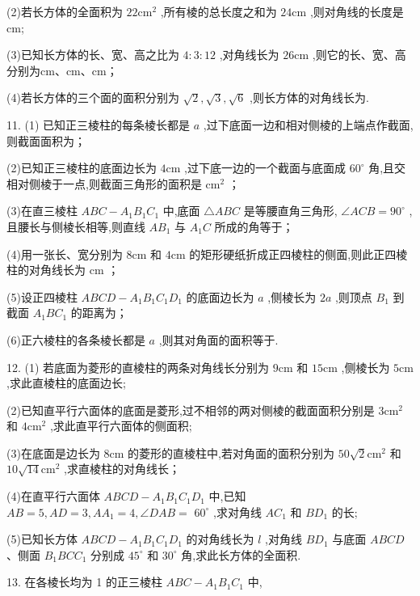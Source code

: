 (2)若长方体的全面积为 ${22}{\mathrm{{cm}}}^{2}$ ,所有棱的总长度之和为 ${24}\mathrm{{cm}}$ ,则对角线的长度是\blkda{}cm;

(3)已知长方体的长、宽、高之比为 $4 : 3 : {12}$ ,对角线长为 ${26}\mathrm{{cm}}$ ,则它的长、宽、高分别为\blkda{}cm、\blkda{}cm、\blkda{}cm；

(4)若长方体的三个面的面积分别为 $\sqrt{2},\sqrt{3},\sqrt{6}$ ,则长方体的对角线长为\blkda{}.

11. (1) 已知正三棱柱的每条棱长都是 $a$ ,过下底面一边和相对侧棱的上端点作截面,则截面面积为\blkda{}；

(2)已知正三棱柱的底面边长为 $4\mathrm{{cm}}$ ,过下底一边的一个截面与底面成 ${60}^{ \circ  }$ 角,且交相对侧棱于一点,则截面三角形的面积是\blkda{} ${\mathrm{{cm}}}^{2}$ ；

(3)在直三棱柱 ${ABC} - {A}_{1}{B}_{1}{C}_{1}$ 中,底面 $\bigtriangleup  {ABC}$ 是等腰直角三角形, $\angle {ACB} = {90}^{ \circ  }$ ,且腰长与侧棱长相等,则直线 $A{B}_{1}$ 与 ${A}_{1}C$ 所成的角等于\blkda{}；

(4)用一张长、宽分别为 $8\mathrm{{cm}}$ 和 $4\mathrm{{cm}}$ 的矩形硬纸折成正四棱柱的侧面,则此正四棱柱的对角线长为\blkda{} $\mathrm{{cm}}$ ；

(5)设正四棱柱 ${ABCD} - {A}_{1}{B}_{1}{C}_{1}{D}_{1}$ 的底面边长为 $a$ ,侧棱长为 ${2a}$ ,则顶点 ${B}_{1}$ 到截面 ${A}_{1}B{C}_{1}$ 的距离为\blkda{}；

(6)正六棱柱的各条棱长都是 $a$ ,则其对角面的面积等于\blkda{}.

12. (1) 若底面为菱形的直棱柱的两条对角线长分别为 $9\mathrm{{cm}}$ 和 ${15}\mathrm{{cm}}$ ,侧棱长为 $5\mathrm{{cm}}$ ,求此直棱柱的底面边长;

(2)已知直平行六面体的底面是菱形,过不相邻的两对侧棱的截面面积分别是 $3{\mathrm{{cm}}}^{2}$ 和 $4{\mathrm{{cm}}}^{2}$ ,求此直平行六面体的侧面积;

(3)在底面是边长为 $8\mathrm{{cm}}$ 的菱形的直棱柱中,若对角面的面积分别为 ${50}\sqrt{2}{\mathrm{{cm}}}^{2}$ 和 ${10}\sqrt{14}{\mathrm{{cm}}}^{2}$ ,求直棱柱的对角线长；

(4)在直平行六面体 ${ABCD} - {A}_{1}{B}_{1}{C}_{1}{D}_{1}$ 中,已知 ${AB} = 5,{AD} = 3,{A{A}_{1}} = 4,\angle {DAB} =$  ${60}^{ \circ  }$ ,求对角线 $A{C}_{1}$ 和 $B{D}_{1}$ 的长;

(5)已知长方体 ${ABCD} - {A}_{1}{B}_{1}{C}_{1}{D}_{1}$ 的对角线长为 $l$ ,对角线 $B{D}_{1}$ 与底面 ${ABCD}$ 、侧面 ${B}_{1}{BC}{C}_{1}$ 分别成 ${45}^{ \circ  }$ 和 ${30}^{ \circ  }$ 角,求此长方体的全面积.

13. 在各棱长均为 1 的正三棱柱 ${ABC} - {A}_{1}{B}_{1}{C}_{1}$ 中,

